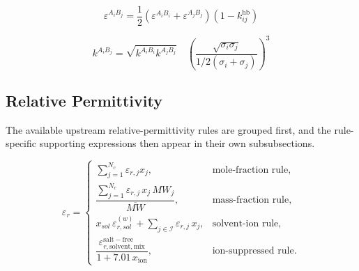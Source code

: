 \documentclass[12pt, letterpaper]{article}
\begin{document}
\begin{equation}
    \varepsilon^{A_{i}B_{j}}=\frac{1}{2}(\varepsilon^{A_{i}B_{i}}+\varepsilon^{A_{j}B_{j}})(1-k_{ij}^{\mathrm{hb}})
    \label{eq:epsilon_assoc_mixing}
\end{equation}


\begin{equation}
    k^{A_{i}B_{j}}=\sqrt{k^{A_{i}B_{i}}k^{A_{j}B_{j}}}\quad\left(\frac{\sqrt{\sigma_{i}\sigma_{j}}}{1/2(\sigma_{i}+\sigma_{j})}\right)^3
    \label{eq:kappa_assoc_mixing}
\end{equation}

\subsection{Relative Permittivity}

The available upstream relative-permittivity rules are grouped first, and the rule-specific supporting expressions then appear in their own subsubsections.


\begin{equation}
    \varepsilon_{r}=
    \begin{cases}
        \sum_{j=1}^{N_{c}}\varepsilon_{r,j}x_{j}, & \text{mole-fraction rule}, \\[10pt]
        \dfrac{\sum_{j=1}^{N_{c}}\varepsilon_{r,j}\,x_{j}\,MW_{j}}{\overline{MW}}, & \text{mass-fraction rule}, \\[12pt]
        x_{sol}\,\varepsilon_{r,sol}^{(w)} + \sum_{j\in\mathcal I}\varepsilon_{r,j}\,x_{j}, & \text{solvent-ion rule}, \\[10pt]
        \dfrac{\varepsilon_{r,\mathrm{solvent,mix}}^{\mathrm{salt-free}}}{1+7.01\,x_{\mathrm{ion}}}, & \text{ion-suppressed rule}.
    \end{cases}
    \label{eq:epsr_mix_rule}
\end{equation}
\end{document}
